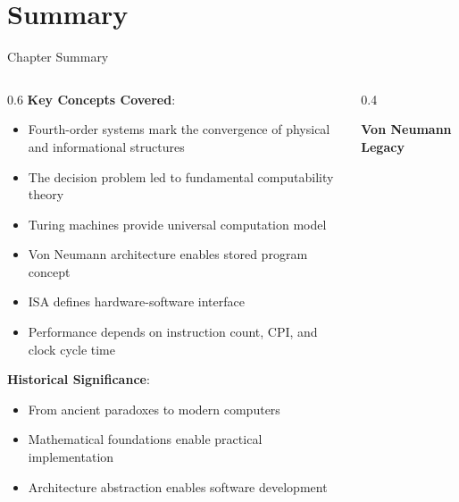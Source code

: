 \documentclass[aspectratio=169]{beamer}
\newcommand{\concept}[1]{\textbf{\color{darkblue}#1}}
\begin{document}
\section{Summary}

\begin{frame}{Chapter Summary}
\begin{columns}
\begin{column}{0.6\textwidth}
\concept{Key Concepts Covered}:
\begin{itemize}
\item Fourth-order systems mark the convergence of physical and informational structures
\item The decision problem led to fundamental computability theory
\item Turing machines provide universal computation model
\item Von Neumann architecture enables stored program concept
\item ISA defines hardware-software interface
\item Performance depends on instruction count, CPI, and clock cycle time
\end{itemize}

\vspace{0.3cm}
\concept{Historical Significance}:
\begin{itemize}
\item From ancient paradoxes to modern computers
\item Mathematical foundations enable practical implementation
\item Architecture abstraction enables software development
\end{itemize}
\end{column}
\begin{column}{0.4\textwidth}
\begin{center}
\textbf{Von Neumann Legacy}
\vspace{0.3cm}

\end{center}
\end{column}
\end{columns}
\end{frame}
\end{document}
